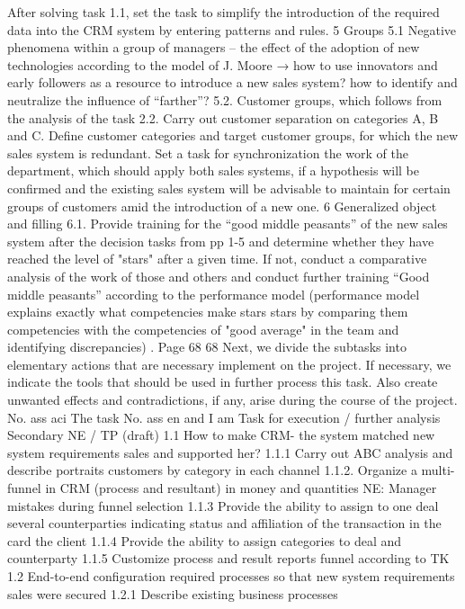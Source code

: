 After solving task 1.1, set the task to simplify the introduction of the required
data into the CRM system by entering patterns and rules.
5
Groups
5.1
Negative phenomena within a group of managers -- the effect of the adoption of new
technologies according to the model of J. Moore → how to use innovators and early
followers as a resource to introduce a new sales system? how
to identify and neutralize the influence of “farther”?
5.2.
Customer groups, which follows from the analysis of the task 2.2. Carry out customer separation
on categories A, B and C. Define customer categories and target customer groups,
for which the new sales system is redundant. Set a task for synchronization
the work of the department, which should apply both sales systems, if a hypothesis
will be confirmed and the existing sales system will be advisable to maintain
for certain groups of customers amid the introduction of a new one.
6
Generalized
object and
filling
6.1.
Provide training for the “good middle peasants” of the new sales system after the decision
tasks from pp 1-5 and determine whether they have reached the level of "stars" after a given time.
If not, conduct a comparative analysis of the work of those and others and conduct further training
“Good middle peasants” according to the performance model (performance model
explains exactly what competencies make stars stars by comparing them
competencies with the competencies of "good average" in the team and identifying
discrepancies) .
Page 68
68
Next, we divide the subtasks into elementary actions that are necessary
implement on the project. If necessary, we indicate the tools that should be used in
further process this task. Also create unwanted effects
and contradictions, if any, arise during the course of the project.
No.
ass
aci
The task
No.
ass
en
and
I am
Task for execution /
further analysis
Secondary NE /
TP (draft)
1.1
How to make CRM-
the system matched
new system requirements
sales and supported her?
1.1.1
Carry out ABC analysis and describe portraits
customers by category in each channel
1.1.2. Organize a multi-funnel in CRM (process
and resultant) in money and quantities
NE: Manager mistakes during
funnel selection
1.1.3
Provide the ability to assign to one
deal several counterparties indicating
status and affiliation of the transaction in the card
the client
1.1.4
Provide the ability to assign
categories to deal and counterparty
1.1.5
Customize process and result reports
funnel according to TK
1.2
End-to-end configuration required
processes so that
new system requirements
sales were secured
1.2.1
Describe existing business processes
